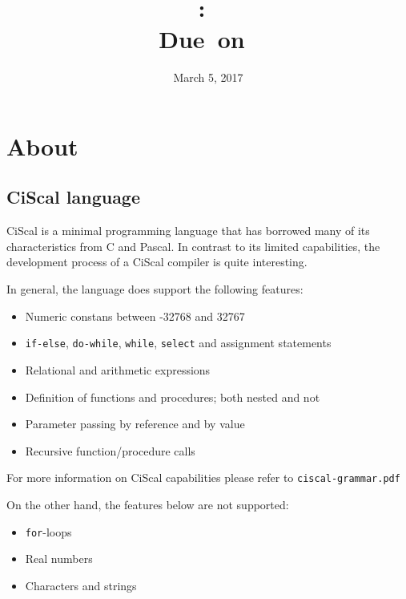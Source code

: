 \documentclass{article}
\title{
\vspace{2in}
\textmd{\textbf{\hmwkClass:\ \hmwkTitle}}\\
\normalsize\vspace{0.1in}\small{Due\ on\ \hmwkDueDate}\\
\vspace{0.1in}\large{\textit{\hmwkClassInstructor}}
\vspace{3in}
}
\author{\textbf{\hmwkAuthorName}}
\date{March 5, 2017} %
\def\code#1{\texttt{#1}} %
\begin{document}
\maketitle


\newpage
\tableofcontents
\newpage


\section{About}

\subsection{CiScal language}
CiScal is a minimal programming language that has borrowed many of its characteristics from C and Pascal.
In contrast to its limited capabilities, the development process of a CiScal compiler is quite interesting.

In general, the language does support the following features:
\begin{itemize}
 \item Numeric constans between -32768 and 32767
 \item \code{if-else}, \code{do-while}, \code{while}, \code{select} and assignment statements
 \item Relational and arithmetic expressions
 \item Definition of functions and procedures; both nested and not
 \item Parameter passing by reference and by value
 \item Recursive function/procedure calls
\end{itemize}

For more information on CiScal capabilities please refer to \code{ciscal-grammar.pdf}

\vspace{0.5cm}
On the other hand, the features below are not supported:
\begin{itemize}
 \item \code{for}-loops
 \item Real numbers
 \item Characters and strings
\end{itemize}
\end{document}
